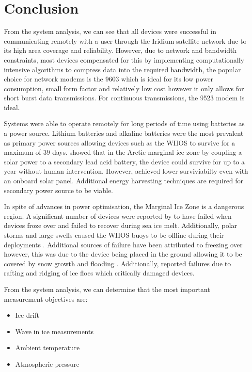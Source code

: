 \section{Conclusion}

From the system analysis, we can see that all devices were successful in communicating remotely with a user through the Iridium satellite network due to its high area coverage and reliability. However, due to network and bandwidth constraints, most devices compensated for this by implementing computationally intensive algorithms to compress data into the required bandwidth, the popular choice for network modems is the 9603 which is ideal for its low power consumption, small form factor and relatively low cost however it only allows for short burst data transmissions. For continuous transmissions, the 9523 modem is ideal. \par 

Systems were able to operate remotely for long periods of time using batteries as a power source. Lithium batteries and alkaline batteries were the most prevalent as primary power sources allowing devices such as the WIIOS to survive for a maximum of 39 days. \textcite{doble2017robust} showed that in the Arctic marginal ice zone by coupling a solar power to a secondary lead acid battery, the device could survive for up to a year without human intervention. However, \textcite{rabault2020development} achieved lower surviviabilty even with an onboard solar panel. Additional energy harvesting techniques are required for secondary power source to be viable. \par 

In spite of advances in power optimisation, the Marginal Ice Zone is a dangerous region. A significant number of devices were reported by \textcite{doble2017robust} to have failed when devices froze over and failed to recover during sea ice melt. Additionally, polar storms and large swells caused the WIIOS buoys to be offline during their deployments \cite{kohout2015device,alberello2019drift}. Additional sources of failure have been attributed to freezing over \textcite{rabault2018investigation} however, this was due to the device being placed in the ground allowing it to be covered by snow growth and flooding \cite{barber2005microwave}. Additionally, \textcite{rabault2019open} reported failures due to rafting and ridging of ice floes which critically damaged devices.\par 

From the system analysis, we can determine that the most important measurement objectives are:
\begin{itemize}
	\item Ice drift
	\item Wave in ice measurements
	\item Ambient temperature
	\item Atmospheric pressure
\end{itemize}

